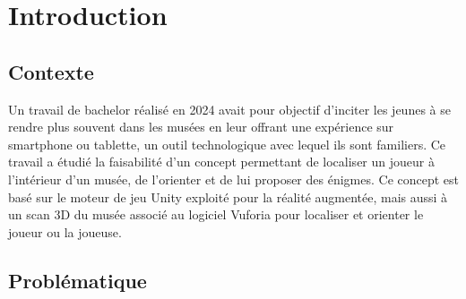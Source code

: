 \chapter{Introduction}



\section{Contexte}\label{Context}


Un travail de bachelor réalisé en 2024 \cite{dilucaRealiteAugmenteeReconnaissance2024} avait pour objectif d'inciter les jeunes à se rendre plus souvent dans les
musées en leur offrant une expérience sur smartphone ou tablette, un outil technologique avec lequel ils sont
familiers. Ce travail a étudié la faisabilité d'un concept permettant de localiser un joueur à l'intérieur d'un
musée, de l'orienter et de lui proposer des énigmes. Ce concept est basé sur le moteur de jeu Unity exploité
pour la réalité augmentée, mais aussi à un scan 3D du musée associé au logiciel Vuforia pour localiser et
orienter le joueur ou la joueuse.
\section{Problématique}


